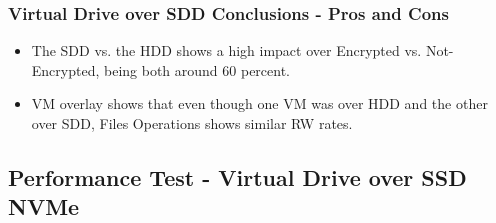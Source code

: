 \vspace*{-\baselineskip}
\subsubsection{Virtual Drive over SDD Conclusions - Pros and Cons}
\begin{itemize}
  \item The SDD vs. the HDD shows a high impact over Encrypted vs. Not-Encrypted, being both around 60 percent.
  \item VM overlay shows that even though one VM was over HDD and the other over SDD, Files Operations shows similar RW rates.
\end{itemize}

\newpage
\subsection{Performance Test - Virtual Drive over SSD NVMe}
